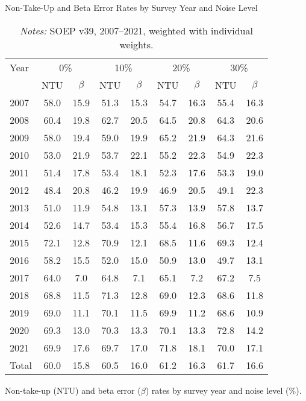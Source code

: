 \begin{table}[htbp]
\setlength{\tabcolsep}{12pt}
\small
\centering
\caption*{Non-Take-Up and Beta Error Rates by Survey Year and Noise Level}
\begin{tabular}{l|cc|cc|cc|cc}
\toprule
Year & \multicolumn{2}{c|}{0\%} & \multicolumn{2}{c|}{10\%} & \multicolumn{2}{c|}{20\%} & \multicolumn{2}{c}{30\%} \\
     & NTU & $\beta$ & NTU & $\beta$ & NTU & $\beta$ & NTU & $\beta$ \\
\midrule
2007 & 58.0 & 15.9 & 51.3 & 15.3 & 54.7 & 16.3 & 55.4 & 16.3 \\
2008 & 60.4 & 19.8 & 62.7 & 20.5 & 64.5 & 20.8 & 64.3 & 20.6 \\
2009 & 58.0 & 19.4 & 59.0 & 19.9 & 65.2 & 21.9 & 64.3 & 21.6 \\
2010 & 53.0 & 21.9 & 53.7 & 22.1 & 55.2 & 22.3 & 54.9 & 22.3 \\
2011 & 51.4 & 17.8 & 53.4 & 18.1 & 52.3 & 17.6 & 53.3 & 19.0 \\
2012 & 48.4 & 20.8 & 46.2 & 19.9 & 46.9 & 20.5 & 49.1 & 22.3 \\
2013 & 51.0 & 11.9 & 54.8 & 13.1 & 57.3 & 13.9 & 57.8 & 13.7 \\
2014 & 52.6 & 14.7 & 53.4 & 15.3 & 55.4 & 16.8 & 56.7 & 17.5 \\
2015 & 72.1 & 12.8 & 70.9 & 12.1 & 68.5 & 11.6 & 69.3 & 12.4 \\
2016 & 58.2 & 15.5 & 52.0 & 15.0 & 50.9 & 13.0 & 49.7 & 13.1 \\
2017 & 64.0 &  7.0 & 64.8 &  7.1 & 65.1 &  7.2 & 67.2 &  7.5 \\
2018 & 68.8 & 11.5 & 71.3 & 12.8 & 69.0 & 12.3 & 68.6 & 11.8 \\
2019 & 69.0 & 11.1 & 70.1 & 11.5 & 69.9 & 11.2 & 68.6 & 10.9 \\
2020 & 69.3 & 13.0 & 70.3 & 13.3 & 70.1 & 13.3 & 72.8 & 14.2 \\
2021 & 69.9 & 17.6 & 69.7 & 17.0 & 71.8 & 18.1 & 70.0 & 17.1 \\
\midrule
Total & 60.0 & 15.8 & 60.5 & 16.0 & 61.2 & 16.3 & 61.7 & 16.6 \\
\bottomrule
\end{tabular}
\caption{\small{Non-take-up (NTU) and beta error (\(\beta\)) rates by survey year and noise level (\%).}}
\caption*{\small{\textit{Notes:} SOEP v39, 2007--2021, weighted with individual weights.}}
\label{tab:conditional_probs_noise_weighted_reduced}
\end{table}
